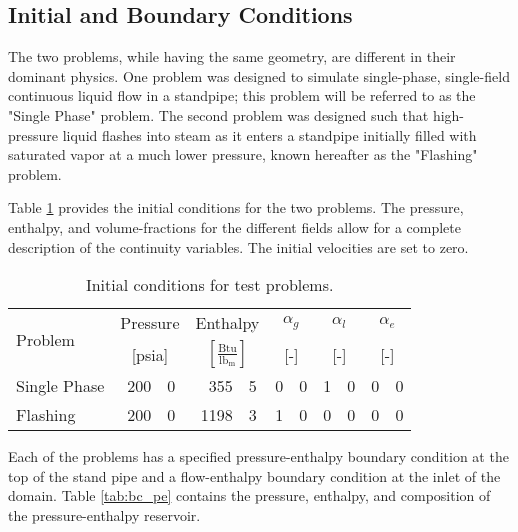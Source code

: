 \subsection{Initial and Boundary Conditions}
\label{subsect:ic_bc}

The two problems, while having the same geometry, are different in their dominant physics.
One problem was designed to simulate single-phase, single-field continuous liquid flow in a standpipe; this problem will be referred to as the "Single Phase" problem.
The second problem was designed such that high-pressure liquid flashes into steam as it enters a standpipe initially filled with saturated vapor at a much lower pressure, known hereafter as the "Flashing" problem.

Table \ref{tab:ic} provides the initial conditions for the two problems.
The pressure, enthalpy, and volume-fractions for the different fields allow for a complete description of the continuity variables.
The initial velocities are set to zero.

\begin{table}[ht]
\centering
\begin{tabular}{@{}lr@{.}lr@{.}lr@{.}lr@{.}lr@{.}l@{}} \toprule
\multirow{2}{*}{Problem} & \multicolumn{2}{c}{Pressure} & \multicolumn{2}{c}{Enthalpy}             & \multicolumn{2}{c}{$\alpha_g$} & \multicolumn{2}{c}{$\alpha_l$} & \multicolumn{2}{c}{$\alpha_e$} \\ 
                         & \multicolumn{2}{c}{[psia]} & \multicolumn{2}{c}{$[\frac{\text{Btu}}{\text{lb}_{\text{m}}}]$} & \multicolumn{2}{c}{[-]}      & \multicolumn{2}{c}{[-]}      & \multicolumn{2}{c}{[-]}      \\ \midrule
Single Phase             &  200&0                       &  355&5                                   & 0&0                            & 1&0                            & 0&0 \\
Flashing                 &  200&0                       & 1198&3                                   & 1&0                            & 0&0                            & 0&0 \\ \bottomrule  
\end{tabular}
\caption{Initial conditions for test problems.}
\label{tab:ic}
\end{table}

Each of the problems has a specified pressure-enthalpy boundary condition at the top of the stand pipe and a flow-enthalpy boundary condition at the inlet of the domain.
Table \ref{tab:bc_pe} contains the pressure, enthalpy, and composition of the pressure-enthalpy reservoir. 

